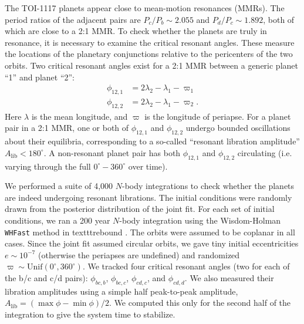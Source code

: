 \documentclass[fleqn,usenatbib,useAMS]{mnras}
\begin{document}
The TOI-1117 planets appear close to mean-motion resonances (MMRs). The period ratios of the adjacent pairs are $P_c/P_b\sim2.055$ and $P_d/P_c\sim1.892$, both of which are close to a 2:1 MMR. To check whether the planets are truly in resonance, it is necessary to examine the critical resonant angles. These measure the locations of the planetary conjunctions relative to the pericenters of the two orbits. Two critical resonant angles exist for a 2:1 MMR between a generic planet ``1'' and planet ``2'':
\begin{align}
\phi_{12,1} &= 2\lambda_2 - \lambda_1 - \varpi_1 \\
\phi_{12,2} &= 2\lambda_2 - \lambda_1 - \varpi_2.
\end{align}
Here $\lambda$ is the mean longitude, and $\varpi$ is the longitude of periapse. For a planet pair in a 2:1 MMR, one or both of $\phi_{12,1}$ and $\phi_{12,2}$ undergo bounded oscillations about their equilibria, corresponding to a so-called ``resonant libration amplitude'' $A_{\mathrm{lib}} < 180^{\circ}$. A non-resonant planet pair has both $\phi_{12,1}$ and $\phi_{12,2}$ circulating (i.e. varying through the full $0^{\circ}-360^{\circ}$ over time). 

We performed a suite of 4,000 $N$-body integrations to check whether the planets are indeed undergoing resonant librations. The initial conditions were randomly drawn from the posterior distribution of the joint fit. For each set of initial conditions, we ran a 200 year $N$-body integration using the Wisdom-Holman \texttt{WHFast} method \citep{WisdomHolman1991, Rein2015} in texttt{rebound} \citep{Rein2012}. The orbits were assumed to be coplanar in all cases. Since the joint fit assumed circular orbits, we gave tiny initial eccentricities $e\sim10^{-7}$ (otherwise the periapses are undefined) and randomized $\varpi\sim \mathrm{Unif}(0^{\circ},360^{\circ})$. We tracked four critical resonant angles (two for each of the b/c and c/d pairs): $\phi_{bc,b}$, $\phi_{bc,c}$, $\phi_{cd,c}$, and $\phi_{cd,d}$. We also measured their libration amplitudes using a simple half peak-to-peak amplitude, $A_{\mathrm{lib}} = (\max \phi - \min \phi)/2$. We computed this only for the second half of the integration to give the system time to stabilize.
\end{document}
